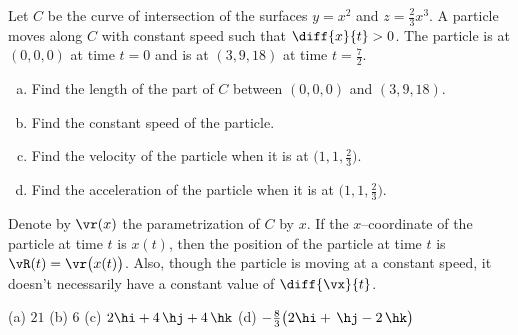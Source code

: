 \begin{question}[M317 1999A] %
 Let $C$ be the curve of intersection of
the surfaces $y=x^2$ and $z=\frac{2}{3}x^3$.
A particle moves along $C$ with constant speed such that $\diff{x}{t}>0$.
The particle is at $(0,0,0)$ at time $t=0$ and is at $(3,9,18)$ at time
$t=\frac{7}{2}$.
\begin{enumerate}[(a)]
\item
Find the length of the part of $C$ between $(0,0,0)$ and $(3,9,18)$.
\item
Find the constant speed of the particle.
\item
Find the velocity of the particle when it is at $\big(1,1,\frac{2}{3}\big)$.
\item
Find the acceleration of the particle when it is at $\big(1,1,\frac{2}{3}\big)$.
\end{enumerate}
\end{question}

\begin{hint} 
Denote by $\vr(x)$ the parametrization of $C$ by $x$. If the $x$--coordinate
of the particle at time $t$ is $x(t)$, then the position of the particle at time $t$ is $\vR(t)=\vr\big(x(t)\big)$. Also, though the particle is moving at a constant speed, it doesn't necessarily have a constant value of $\diff{\vx}{t}$.
\end{hint}

\begin{answer} 
(a) $21$\qquad
(b) $6$\qquad
(c) $2\hi+4\,\hj+4\,\hk$\qquad
(d) $-\frac{8}{3}\big(2\hi+\,\hj-2\,\hk\big)$
\end{answer}

